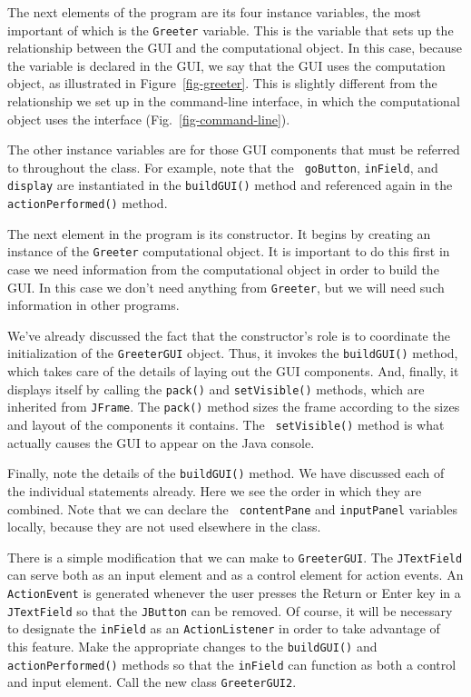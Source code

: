 The next elements of the program are its four instance variables, the
most important of which is the {\tt Greeter} variable. This is the
variable that sets up the relationship between the GUI and the
computational object. In this case, because the variable is declared
in the GUI, we say that the GUI uses the computation object, as
illustrated in Figure~\ref{fig-greeter}.  This is slightly different
from the relationship we set up in the command-line interface, in
which the computational object uses the interface
(Fig.~\ref{fig-command-line}).

The other instance variables are for those GUI components that must be
referred to throughout the class. For example, note that the {\tt
goButton}, {\tt inField}, and {\tt display} are instantiated in the
{\tt buildGUI()} method and referenced again in the {\tt
actionPerformed()} method.

The next element in the program is its constructor. It begins by
creating an instance of the {\tt Greeter} computational object. It is
important to do this first in case we need information from the
computational object in order to build the GUI. In this case we don't
need anything from {\tt Greeter}, but we will need such information in
other programs.

We've already discussed the fact that the constructor's role is to
coordinate the initialization of the {\tt GreeterGUI} object. Thus, it
invokes the {\tt buildGUI()} method, which takes care of the details
of laying out the GUI components. And, finally, it displays itself by
calling the {\tt pack()} and {\tt setVisible()} methods, which are inherited
from {\tt JFrame}. The {\tt pack()} method sizes the frame according
to the sizes and layout of the components it contains. The {\tt
setVisible()} method is what actually causes the GUI to appear on the Java
console.

Finally, note the details of the {\tt buildGUI()} method. We have
discussed each of the individual statements already. Here we see the
order in which they are combined.  Note that we can declare the {\tt
contentPane} and {\tt inputPanel} variables locally, because they are
not used elsewhere in the class.

\begin{SSTUDY}
\item There is a simple modification that we can make to {\tt GreeterGUI}. 
The {\tt JTextField} can serve both as an input element and as a control 
element for action events. An {\tt ActionEvent}
is generated whenever the user presses the Return or Enter key in a
{\tt JTextField} so that the {\tt JButton} can be removed.  Of course, it 
will be necessary to designate the {\tt inField} as an {\tt ActionListener} 
in order to take advantage of this
feature.  Make the appropriate changes to the {\tt buildGUI()} and
{\tt actionPerformed()} methods so that the {\tt inField} can function
as both a control and input element.  Call the new class {\tt GreeterGUI2}.

\end{SSTUDY}


